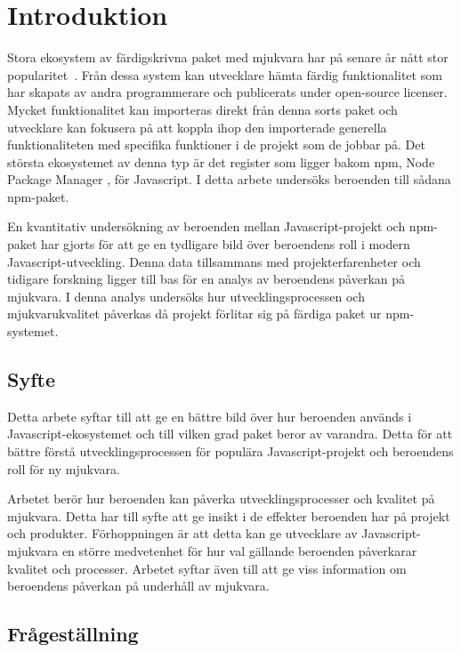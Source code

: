 \section{Introduktion}
\label{sec:joel_o-introduction}
Stora ekosystem av färdigskrivna paket med mjukvara har på senare år nått stor popularitet~\cite{Wittern:2016}. Från dessa system kan utvecklare hämta färdig funktionalitet som har skapats av andra programmerare och publicerats under open-source licenser. Mycket funktionalitet kan importeras direkt från denna sorts paket och utvecklare kan fokusera på att koppla ihop den importerade generella funktionaliteten med specifika funktioner i de projekt som de jobbar på. Det största ekosystemet av denna typ är det register som ligger bakom npm, Node Package Manager \cite{Decan2018}, för Javascript. I detta arbete undersöks beroenden till sådana npm-paket.

En kvantitativ undersökning av beroenden mellan Javascript-projekt och npm-paket har gjorts för att ge en tydligare bild över beroendens roll i modern Javascript-utveckling. Denna data tillsammans med projekterfarenheter och tidigare forskning ligger till bas för en analys av beroendens påverkan på mjukvara. I denna analys undersöks hur utvecklingsprocessen och mjukvarukvalitet påverkas då projekt förlitar sig på färdiga paket ur npm-systemet.

\subsection{Syfte}
Detta arbete syftar till att ge en bättre bild över hur beroenden används i Javascript-ekosystemet och till vilken grad paket beror av varandra. Detta för att bättre förstå utvecklingsprocessen för populära Javascript-projekt och beroendens roll för ny mjukvara.

Arbetet berör hur beroenden kan påverka utvecklingsprocesser och kvalitet på mjukvara. Detta har till syfte att ge insikt i de effekter beroenden har på projekt och produkter. Förhoppningen är att detta kan ge utvecklare av Javascript-mjukvara en större medvetenhet för hur val gällande beroenden påverkarar kvalitet och processer. Arbetet syftar även till att ge viss information om beroendens påverkan på underhåll av mjukvara.

\subsection{Frågeställning}
\label{subsec:joel_o-research-questions}

